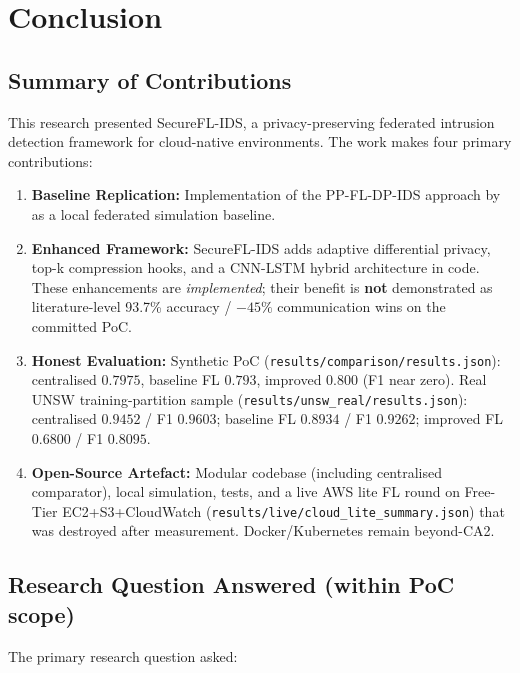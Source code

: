\section{Conclusion}
\label{sec:conclusion}

\subsection{Summary of Contributions}

This research presented SecureFL-IDS, a privacy-preserving federated intrusion detection framework for cloud-native environments. The work makes four primary contributions:

\begin{enumerate}
    \item \textbf{Baseline Replication:} Implementation of the PP-FL-DP-IDS approach by \citet{saklani2026privacy} as a local federated simulation baseline.
    
    \item \textbf{Enhanced Framework:} SecureFL-IDS adds adaptive differential privacy, top-k compression hooks, and a CNN-LSTM hybrid architecture in code. These enhancements are \emph{implemented}; their benefit is \textbf{not} demonstrated as literature-level 93.7\% accuracy / $-45\%$ communication wins on the committed PoC.
    
    \item \textbf{Honest Evaluation:} Synthetic PoC (\texttt{results/comparison/results.json}): centralised $0.7975$, baseline FL $0.793$, improved $0.800$ (F1 near zero). Real UNSW training-partition sample (\texttt{results/unsw\_real/results.json}): centralised $0.9452$ / F1 $0.9603$; baseline FL $0.8934$ / F1 $0.9262$; improved FL $0.6800$ / F1 $0.8095$.
    
    \item \textbf{Open-Source Artefact:} Modular codebase (including centralised comparator), local simulation, tests, and a live AWS lite FL round on Free-Tier EC2+S3+CloudWatch (\texttt{results/live/cloud\_lite\_summary.json}) that was destroyed after measurement. Docker/Kubernetes remain beyond-CA2.
\end{enumerate}

\subsection{Research Question Answered (within PoC scope)}

The primary research question asked:

